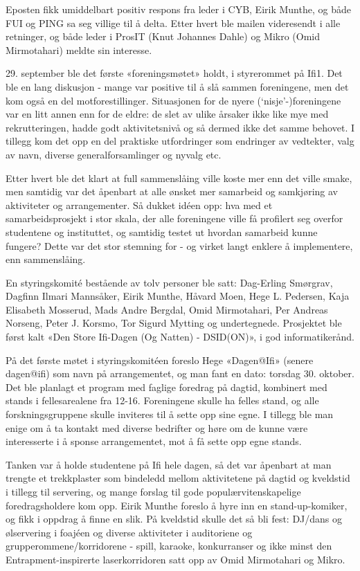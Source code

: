 Eposten fikk umiddelbart positiv respons fra leder i CYB, Eirik Munthe, og både FUI og PING sa seg villige til å delta. Etter hvert ble mailen videresendt i alle retninger, og både leder i ProsIT (Knut Johannes Dahle) og Mikro (Omid Mirmotahari) meldte sin interesse.

29. september ble det første «foreningsmøtet» holdt, i styrerommet på Ifi1. Det ble en lang diskusjon - mange var positive til å slå sammen foreningene, men det kom også en del motforestillinger. Situasjonen for de nyere (`nisje'-)foreningene var en litt annen enn for de eldre: de slet av ulike årsaker ikke like mye med rekrutteringen, hadde godt aktivitetsnivå og så dermed ikke det samme behovet. I tillegg kom det opp en del praktiske utfordringer som endringer av vedtekter, valg av navn, diverse generalforsamlinger og nyvalg etc.

Etter hvert ble det klart at full sammenslåing ville koste mer enn det ville smake, men samtidig var det åpenbart at alle ønsket mer samarbeid og samkjøring av aktiviteter og arrangementer. Så dukket idéen opp: hva med et samarbeidsprosjekt i stor skala, der alle foreningene ville få profilert seg overfor studentene og instituttet, og samtidig testet ut hvordan samarbeid kunne fungere? Dette var det stor stemning for - og virket langt enklere å implementere, enn sammenslåing.

En styringskomité bestående av tolv personer ble satt: Dag-Erling Smørgrav, Dagfinn Ilmari Mannsåker, Eirik Munthe, Håvard Moen, Hege L. Pedersen, Kaja Elisabeth Mosserud, Mads Andre Bergdal, Omid Mirmotahari, Per Andreas Norseng, Peter J. Korsmo, Tor Sigurd Mytting og undertegnede. Prosjektet ble først kalt «Den Store Ifi-Dagen (Og Natten) - DSID(ON)», i god informatikerånd.

På det første møtet i styringskomitéen foreslo Hege «Dagen@Ifi» (senere dagen@ifi) som navn på arrangementet, og man fant en dato: torsdag 30. oktober. Det ble planlagt et program med faglige foredrag på dagtid, kombinert med stands i fellesarealene fra 12-16. Foreningene skulle ha felles stand, og alle forskningsgruppene skulle inviteres til å sette opp sine egne. I tillegg ble man enige om å ta kontakt med diverse bedrifter og høre om de kunne være interesserte i å sponse arrangementet, mot å få sette opp egne stands.

Tanken var å holde studentene på Ifi hele dagen, så det var åpenbart at man trengte et trekkplaster som bindeledd mellom aktivitetene på dagtid og kveldstid i tillegg til servering, og mange forslag til gode populærvitenskapelige foredragsholdere kom opp. Eirik Munthe foreslo å hyre inn en stand-up-komiker, og fikk i oppdrag å finne en slik. På kveldstid skulle det så bli fest: DJ/dans og ølservering i foajéen og diverse aktiviteter i auditoriene og grupperommene/korridorene - spill, karaoke, konkurranser og ikke minst den Entrapment-inspirerte laserkorridoren satt opp av Omid Mirmotahari og Mikro.

